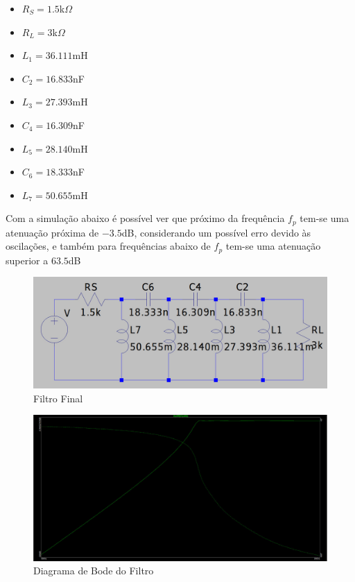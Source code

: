 \documentclass[14pt, oneside]{book}
\newcommand\tab[1][1cm]{\hspace*{#1}}
\theoremstyle{definition}
\begin{document}
            \begin{itemize}
                \item $R_S = 1.5$k$\Omega$
                \item $R_L = 3$k$\Omega$
                \item $L_1 = 36.111$mH
                \item $C_2 =16.833$nF
                \item $L_3 = 27.393$mH
                \item $C_4 = 16.309$nF
                \item $L_5 = 28.140$mH
                \item $C_6 = 18.333$nF
                \item $L_7 = 50.655$mH
            \end{itemize}
            
            \tab Com a simulação abaixo é possível ver que próximo da frequência $f_p$ tem-se uma atenuação próxima de $-3.5$dB, considerando um possível erro devido às oscilações, e também para frequências abaixo de $f_p$ tem-se uma atenuação superior a $63.5$dB
            
            \begin{figure}[H]
                \centering
                \includegraphics[scale=0.3]{circuitado.jpeg}
                \caption{Filtro Final}
                \label{a}
            \end{figure}
            
            \begin{figure}[H]
                \centering
                \includegraphics[scale=0.4]{bode.jpeg}
                \caption{Diagrama de Bode do Filtro}
                \label{a}
            \end{figure}
            
\end{document}
